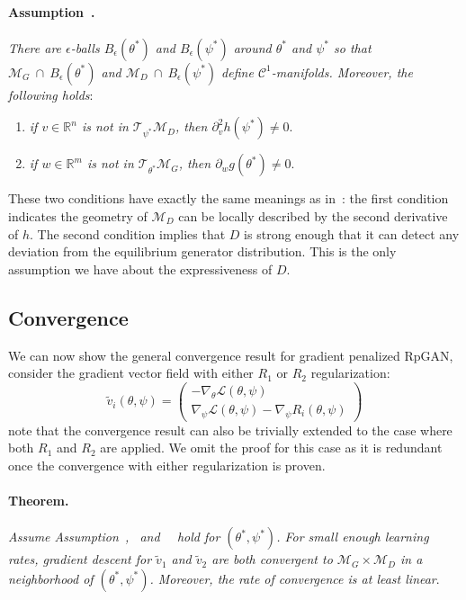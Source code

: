 \paragraph{Assumption~.}
\label{a:3}
\emph{There are $\epsilon$-balls $B_\epsilon(\theta^*)$ and $B_\epsilon(\psi^*)$ around $\theta^*$ and $\psi^*$ so that $\mathcal{M}_G\ \cap\ B_\epsilon(\theta^*)$ and $\mathcal{M}_D\ \cap\ B_\epsilon(\psi^*)$ define $\mathcal{C}^1$-manifolds. Moreover, the following holds}:
\begin{enumerate}[label=(\roman*)]
\item \emph{if $v\in\mathbb{R}^n$ is not in $\mathcal{T}_{\psi^*}\mathcal{M}_D$, then $\partial_v^2h(\psi^*)\neq0$}.
\item \emph{if $w\in\mathbb{R}^m$ is not in $\mathcal{T}_{\theta^*}\mathcal{M}_G$, then $\partial_wg(\theta^*)\neq0$}.
\end{enumerate}

These two conditions have exactly the same meanings as in~\cite{r1}: the first condition indicates the geometry of $\mathcal{M}_D$ can be locally described by the second derivative of $h$. The second condition implies that $D$ is strong enough that it can detect any deviation from the equilibrium generator distribution. This is the only assumption we have about the expressiveness of $D$.

\subsection{Convergence}
We can now show the general convergence result for gradient penalized RpGAN, consider the gradient vector field with either $R_1$ or $R_2$ regularization:
\begin{equation}
\label{eq:vreg}
\tilde{v}_i(\theta,\psi)=\begin{pmatrix}
-\nabla_\theta\mathcal{L}(\theta,\psi)\\ 
\nabla_\psi\mathcal{L}(\theta,\psi)-\nabla_\psi R_i(\theta,\psi)
\end{pmatrix}
\end{equation}
note that the convergence result can also be trivially extended to the case where both $R_1$ and $R_2$ are applied. We omit the proof for this case as it is redundant once the convergence with either regularization is proven.

\paragraph{Theorem.} \emph{Assume Assumption~,~ and~~ hold for $(\theta^*,\psi^*)$. For small enough learning rates, gradient descent for $\tilde{v}_1$ and $\tilde{v}_2$ are both convergent to $\mathcal{M}_G\times\mathcal{M}_D$ in a neighborhood of $(\theta^*,\psi^*)$. Moreover, the rate of convergence is at least linear}.

